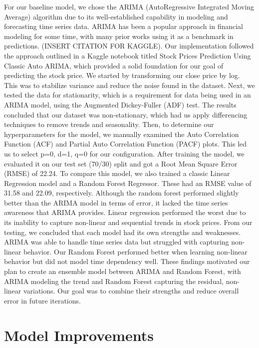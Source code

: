 \documentclass[conference]{IEEEtran}
\begin{document}
For our baseline model, we chose the ARIMA (AutoRegressive Integrated Moving Average) algorithm due to its well-established capability in modeling and forecasting time series data. ARIMA has been a popular approach in financial modeling for some time, with many prior works using it as a benchmark in predictions. (INSERT CITATION FOR KAGGLE).
Our implementation followed the approach outlined in a Kaggle notebook titled Stock Prices Prediction Using Classic Auto ARIMA, which provided a solid foundation for our goal of predicting the stock price. We started by transforming our close price by log. This was to stabilize variance and reduce the noise found in the dataset. Next, we tested the data for stationarity, which is a requirement for data being used in an ARIMA model, using the Augmented Dickey-Fuller (ADF) test. The results concluded that our dataset was non-stationary, which had us apply differencing techniques to remove trends and seasonality.
Then, to determine our hyperparameters for the model, we manually examined the Auto Correlation Function (ACF) and Partial Auto Correlation Function (PACF) plots. This led us to select p=0, d=1, q=0 for our configuration. After training the model, we evaluated it on our test set (70/30) split and got a Root Mean Square Error (RMSE) of 22.24.
To compare this model, we also trained a classic Linear Regression model and a Random Forest Regressor. These had an RMSE value of 31.58 and 22.09, respectively. Although the random forest performed slightly better than the ARIMA model in terms of error, it lacked the time series awareness that ARIMA provides. Linear regression performed the worst due to its inability to capture non-linear and sequential trends in stock prices.
From our testing, we concluded that each model had its own strengths and weaknesses. ARIMA was able to handle time series data but struggled with capturing non-linear behavior. Our Random Forest performed better when learning non-linear behavior but did not model time dependency well. 
These findings motivated our plan to create an ensemble model between ARIMA and Random Forest, with ARIMA modeling the trend and Random Forest capturing the residual, non-linear variations. Our goal was to combine their strengths and reduce overall error in future iterations.

\section{Model Improvements}
\end{document}
